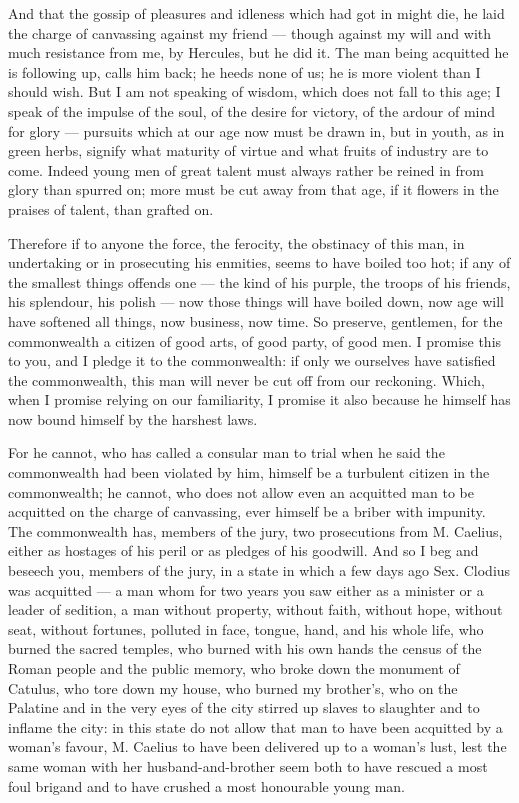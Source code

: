  And that the gossip of pleasures and idleness which had got in might die, he laid the charge of canvassing against my friend --- though against my will and with much resistance from me, by Hercules, but he did it. The man being acquitted he is following up, calls him back; he heeds none of us; he is more violent than I should wish. But I am not speaking of wisdom, which does not fall to this age; I speak of the impulse of the soul, of the desire for victory, of the ardour of mind for glory --- pursuits which at our age now must be drawn in, but in youth, as in green herbs, signify what maturity of virtue and what fruits of industry are to come. Indeed young men of great talent must always rather be reined in from glory than spurred on; more must be cut away from that age, if it flowers in the praises of talent, than grafted on.

 Therefore if to anyone the force, the ferocity, the obstinacy of this man, in undertaking or in prosecuting his enmities, seems to have boiled too hot; if any of the smallest things offends one --- the kind of his purple, the troops of his friends, his splendour, his polish --- now those things will have boiled down, now age will have softened all things, now business, now time. So preserve, gentlemen, for the commonwealth a citizen of good arts, of good party, of good men. I promise this to you, and I pledge it to the commonwealth: if only we ourselves have satisfied the commonwealth, this man will never be cut off from our reckoning. Which, when I promise relying on our familiarity, I promise it also because he himself has now bound himself by the harshest laws.

 For he cannot, who has called a consular man to trial when he said the commonwealth had been violated by him, himself be a turbulent citizen in the commonwealth; he cannot, who does not allow even an acquitted man to be acquitted on the charge of canvassing, ever himself be a briber with impunity. The commonwealth has, members of the jury, two prosecutions from M. Caelius, either as hostages of his peril or as pledges of his goodwill. And so I beg and beseech you, members of the jury, in a state in which a few days ago Sex. Clodius was acquitted --- a man whom for two years you saw either as a minister or a leader of sedition, a man without property, without faith, without hope, without seat, without fortunes, polluted in face, tongue, hand, and his whole life, who burned the sacred temples, who burned with his own hands the census of the Roman people and the public memory, who broke down the monument of Catulus, who tore down my house, who burned my brother's, who on the Palatine and in the very eyes of the city stirred up slaves to slaughter and to inflame the city: in this state do not allow that man to have been acquitted by a woman's favour, M. Caelius to have been delivered up to a woman's lust, lest the same woman with her husband-and-brother seem both to have rescued a most foul brigand and to have crushed a most honourable young man.

